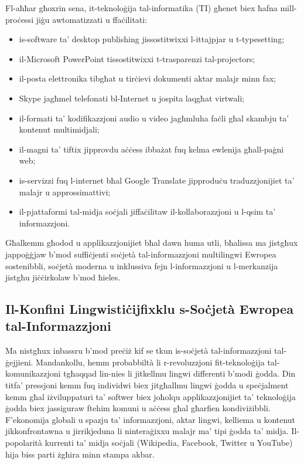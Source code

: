 \documentclass[]{../../metanetpaper}
\begin{document}
\begin{multicols}{2}
Fl-aħħar għoxrin sena, it-teknoloġija tal-informatika (TI) għenet biex ħafna mill-proċessi jiġu awtomatizzati u ffaċilitati:

\begin{itemize}
\item is-software ta’ desktop publishing jissostitwixxi l-ittajpjar u t-typesetting;
\item il-Microsoft PowerPoint tissostitwixxi t-trasparenzi tal-projectors;
\item il-posta elettronika tibgħat u tirċievi dokumenti aktar malajr minn fax;
\item Skype jagħmel telefonati bl-Internet u jospita laqgħat virtwali;
\item il-formati ta’ kodifikazzjoni audio u video jagħmluha faċli għal skambju ta’ kontenut multimidjali; 
\item il-magni ta’ tiftix jipprovdu aċċess ibbażat fuq kelma ewlenija għall-paġni web;
\item is-servizzi fuq l-internet bħal Google Translate jipproduċu traduzzjonijiet ta’ malajr u approssimattivi;
\item il-pjattaformi tal-midja soċjali jiffaċilitaw il-kollaborazzjoni u l-qsim ta’ informazzjoni. 
\end{itemize}

Għalkemm għodod u applikazzjonijiet bħal dawn huma utli, bħalissa ma jistgħux jappoġġjaw b'mod suffiċjenti soċjetà tal-informazzjoni multilingwi Ewropea sostenibbli, soċjetà moderna u inklussiva fejn l-informazzjoni u l-merkanzija jistgħu jiċċirkolaw b’mod ħieles.

\subsection[Il-Konfini Lingwistiċi jfixklu s-Soċjetà Ewropea tal-Informazzjoni]{Il-Konfini Lingwistiċi\newline jfixklu s-Soċjetà Ewropea tal-Informazzjoni}
  
Ma nistgħux inbassru b’mod preċiż kif se tkun is-soċjetà tal-informazzjoni tal-ġejjieni. Mandankollu, hemm probabbiltà li r-revoluzzjoni fit-teknoloġija tal-komunikazzjoni tgħaqqad lin-nies li jitkellmu lingwi differenti b'modi ġodda. Din titfa' pressjoni kemm fuq individwi biex jitgħallmu lingwi ġodda u speċjalment kemm għal iżviluppaturi ta' softwer biex joħolqu applikazzjonijiet ta' teknoloġija ġodda biex jassiguraw ftehim komuni u aċċess għal għarfien kondiviżibbli. F’ekonomija globali u spazju ta’ informazzjoni, aktar lingwi, kelliema u kontenut  jikkonfrontawna u jirrikjeduna li ninteraġixxu malajr ma’ tipi ġodda ta’ midja. Il-popolarità kurrenti ta’ midja soċjali (Wikipedia, Facebook, Twitter u YouTube) hija biss parti żgħira minn stampa akbar.


\end{multicols}
\end{document}
